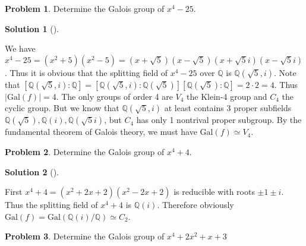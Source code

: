 \documentclass{article}
\theoremstyle{definition}
\newtheorem{prob}{Problem}
\newtheorem*{sol}{Solution}
\newenvironment{sols}[1][]{%
  \begin{sol}[#1]$ $\par\nobreak\ignorespaces
}{%
  \end{sol}
}
\newcommand{\QQ}{\mathbb Q}
\newcommand{\Gal}{\text{Gal}}
\begin{document}
\setcounter{prob}{3}
\begin{prob}
	Determine the Galois group of $x^4 - 25$.
\end{prob}

\begin{sols}
	We have $x^4 - 25 = (x^2 + 5)(x^2 - 5) = (x + \sqrt{5})(x - \sqrt{5}) (x + \sqrt{5} i) (x - \sqrt{5} i)$.
	Thus it is obvious that the splitting field of $x^4 - 25$ over $\QQ$ is $\QQ(\sqrt{5}, i)$.
	Note that $[\QQ(\sqrt{5}, i):\QQ] = [\QQ(\sqrt{5}, i):\QQ(\sqrt{5})][\QQ(\sqrt{5}):\QQ] = 2 \cdot 2 = 4$.
	Thus $|\Gal(f)| = 4$.
	The only groups of order 4 are $V_4$ the Klein-4 group and $C_4$ the cyclic group.
	But we know that $\QQ(\sqrt{5}, i)$ at least contains 3 proper subfields $\QQ(\sqrt{5}), \QQ(i), \QQ(\sqrt{5} i)$, but $C_4$ has only 1 nontrival proper subgroup.
	By the fundamental theorem of Galois theory, we must have $\Gal(f) \simeq V_4$.
\end{sols}

\begin{prob}
	Determine the Galois group of $x^4 + 4$.
\end{prob}

\begin{sols}
	First $x^4 + 4 = (x^2 + 2x + 2) (x^2 - 2x + 2)$ is reducible with roots $\pm 1 \pm i$.
	Thus the splitting field of $x^4 + 4$ is $\QQ(i)$.
	Therefore obviously $\Gal(f) = \Gal(\QQ(i)/\QQ) \simeq C_2$.
\end{sols}

\setcounter{prob}{6}
\begin{prob}
	Determine the Galois group of $x^4 + 2x^2 + x + 3$
\end{prob}
\end{document}
